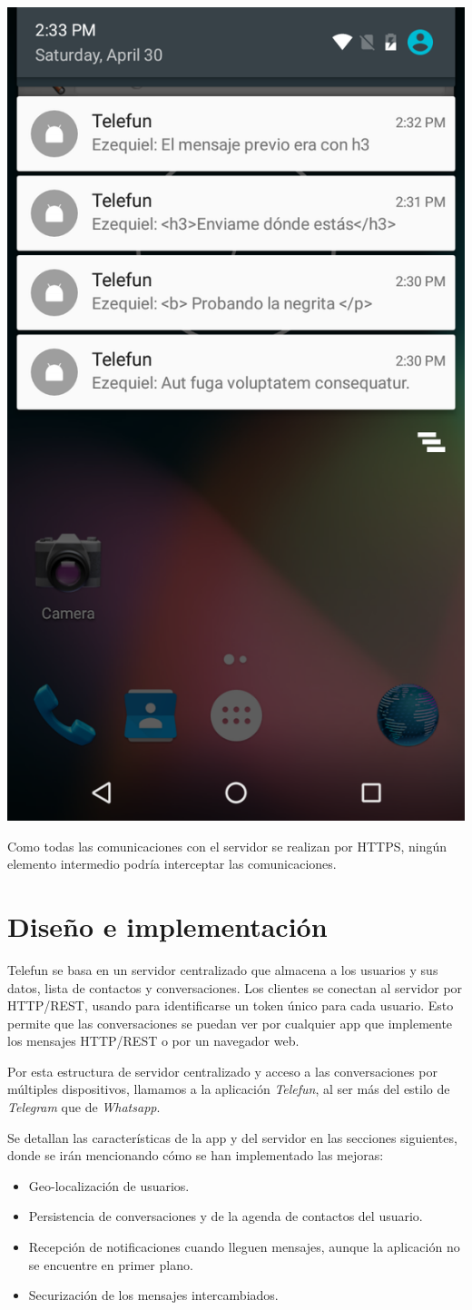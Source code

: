 \documentclass[]{article}
\begin{document}
\begin{center}
		 \includegraphics[width=0.35\linewidth]{images/notifications.png}
\end{center}


\hfill

Como todas las comunicaciones con el servidor se realizan por HTTPS, ningún elemento intermedio podría interceptar las comunicaciones.


\section{Diseño e implementación}


Telefun se basa en un servidor centralizado que almacena a los usuarios y sus datos, lista de contactos y conversaciones. Los clientes se conectan al servidor por HTTP/REST, usando para identificarse un token único para cada usuario. Esto permite que las conversaciones se puedan ver por cualquier app que implemente los mensajes HTTP/REST o por un navegador web.

Por esta estructura de servidor centralizado y acceso a las conversaciones por múltiples dispositivos, llamamos a la aplicación \textit{Telefun}, al ser más del estilo de \textit{Telegram} que de \textit{Whatsapp}.

Se detallan las características de la app y del servidor en las secciones siguientes, donde se irán mencionando cómo se han implementado las mejoras:
\begin{itemize}
	\item Geo-localización de usuarios.
	\item Persistencia de conversaciones y de la agenda de contactos del usuario.
	\item Recepción de notificaciones cuando lleguen mensajes, aunque la aplicación no se encuentre en primer plano.
	\item Securización de los mensajes intercambiados.
\end{itemize}
\end{document}

